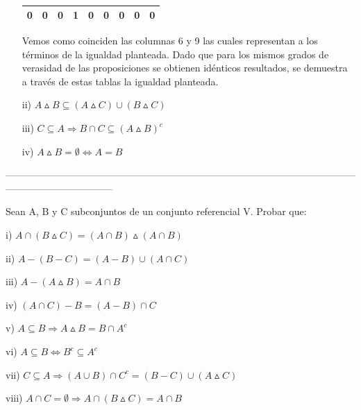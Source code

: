 \documentclass[10pt]{article}
\begin{document}
\begin{ej}
\begin{itemize}
\begin{table}[H]
\begin{center}
\begin{tabular}{|c|c|c|c|c|c|c|c|c|}
 			\hline		
0 & 0 & 0 &      1     &               0                    &                    0                                 &              0              &               0               &                              0                                              \\ 
 			\hline		
		\end{tabular}
		\caption{}
	\end{center}
\end{table}	
	 	Vemos como coinciden las columnas 6 y 9 las cuales representan a los términos de la igualdad planteada.
	 	Dado que para los mismos grados de verasidad de las proposiciones se obtienen  idénticos resultados, se demuestra a través de estas tablas la igualdad planteada. 
	\item[ii)] $A \vartriangle B \subseteq (A \vartriangle C) \cup (B \vartriangle C)$
	\item[iii) ]$C \subseteq A \Rightarrow B \cap C \subseteq (A \vartriangle B)^c$
	\item[iv)] $A \vartriangle B = \emptyset \Leftrightarrow A = B$
\end{itemize}
\end{ej}
---------------------------------------------------------------------------------------------------------------------------------------------
\begin{ej}
Sean A, B  y C subconjuntos de  un conjunto referencial V. Probar que:

\begin{itemize}
	\begin{minipage}[b]{0.5\linewidth}
		\item[i)] $A \cap (B \vartriangle C) = (A \cap B) \vartriangle (A \cap B)$
		\item[ii)] $A - (B -C) = (A -B) \cup (A \cap C)$
		\item[iii)] $A - (A \vartriangle B) = A \cap B$
		\item[iv)] $(A \cap C) - B = (A-B) \cap C$	
	\end{minipage}	 	
	\begin{minipage}[b]{0.5\linewidth}	
		\item[v)] $A \subseteq B \Rightarrow A \vartriangle B = B \cap A^c$
		\item[vi)] $A \subseteq B \Leftrightarrow B^c \subseteq A^c$
		\item[vii)] $C \subseteq A \Rightarrow (A \cup B) \cap C^c = (B-C) \cup (A \vartriangle C) $
		\item[viii)] $A \cap C = \emptyset \Rightarrow A \cap (B \vartriangle C)= A \cap B$
	\end{minipage}
\end{itemize}

\end{ej}
\end{document}
